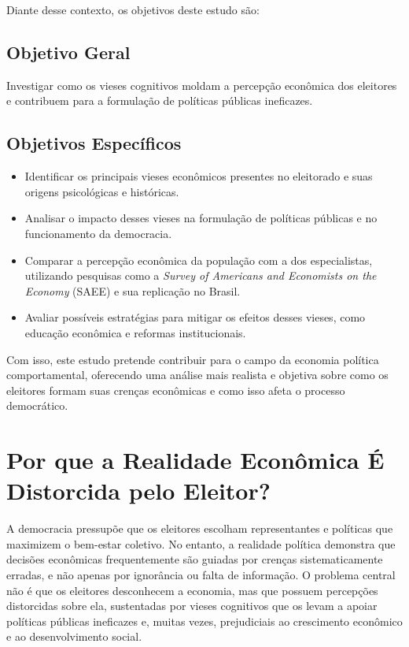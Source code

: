 Diante desse contexto, os objetivos deste estudo são:

\subsection{Objetivo Geral} %

Investigar como os vieses cognitivos moldam a percepção econômica dos eleitores e contribuem para a formulação de políticas públicas ineficazes.

\subsection{Objetivos Específicos} %

\begin{itemize}
    \item Identificar os principais vieses econômicos presentes no eleitorado e suas origens psicológicas e históricas.
    \item Analisar o impacto desses vieses na formulação de políticas públicas e no funcionamento da democracia.
    \item Comparar a percepção econômica da população com a dos especialistas, utilizando pesquisas como a \textit{Survey of Americans and Economists on the Economy} (SAEE) e sua replicação no Brasil.
    \item Avaliar possíveis estratégias para mitigar os efeitos desses vieses, como educação econômica e reformas institucionais.
\end{itemize}

Com isso, este estudo pretende contribuir para o campo da economia política comportamental, oferecendo uma análise mais realista e objetiva sobre como os eleitores formam suas crenças econômicas e como isso afeta o processo democrático.

\section{Por que a Realidade Econômica É Distorcida pelo Eleitor?} %

A democracia pressupõe que os eleitores escolham representantes e políticas que maximizem o bem-estar coletivo. No entanto, a realidade política demonstra que decisões econômicas frequentemente são guiadas por crenças sistematicamente erradas, e não apenas por ignorância ou falta de informação. O problema central não é que os eleitores desconhecem a economia, mas que possuem percepções distorcidas sobre ela, sustentadas por vieses cognitivos que os levam a apoiar políticas públicas ineficazes e, muitas vezes, prejudiciais ao crescimento econômico e ao desenvolvimento social.

